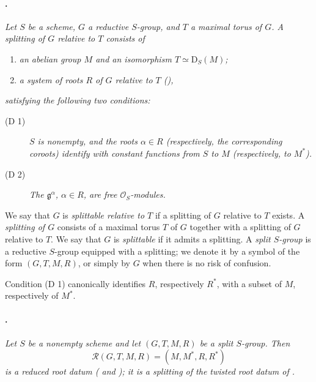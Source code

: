\paragraph{.}
\textit{Let \(S\) be a scheme, \(G\) a reductive \(S\)-group, and
\(T\) a maximal torus of \(G\). A \emph{splitting of \(G\) relative
to \(T\)} consists of}
\begin{enumerate}
\item[\SGAInlineRefTarget{sga3:xxii:def:1.13:item:i}(i)] \textit{an abelian group \(M\) and an isomorphism
  \(T\simeq\mathrm D_S(M)\);}
\item[\SGAInlineRefTarget{sga3:xxii:def:1.13:item:ii}(ii)] \textit{a system of roots \(R\) of \(G\) relative to
  \(T\) \textup{()},}
\end{enumerate}
\textit{satisfying the following two conditions:}
\begin{description}
\item[\textup{(D 1)}]
  \textit{\(S\) is nonempty, and the roots \(\alpha\in R\)
  \textup{(respectively, the corresponding coroots)} identify with
  constant functions from \(S\) to \(M\) \textup{(respectively, to
  \(M^*\))}.}
\item[\textup{(D 2)}]
  \textit{The \(\mathfrak g^\alpha\), \(\alpha\in R\), are free
  \(\mathcal O_S\)-modules.}
\end{description}

We say that \(G\) is \emph{splittable relative to \(T\)} if a
splitting of \(G\) relative to \(T\) exists. A \emph{splitting of
\(G\)} consists of a maximal torus \(T\) of \(G\) together with a
splitting of \(G\) relative to \(T\). We say that \(G\) is
\emph{splittable} if it admits a splitting. A \emph{split
\(S\)-group} is a reductive \(S\)-group equipped with a splitting;
we denote it by a symbol of the form \((G,T,M,R)\), or simply by
\(G\) when there is no risk of confusion.

Condition \textup{(D 1)} canonically identifies \(R\), respectively
\(R^*\), with a subset of \(M\), respectively of \(M^*\).

\paragraph{.}
\textit{Let \(S\) be a nonempty scheme and let \((G,T,M,R)\) be a
split \(S\)-group. Then}
\[
  \mathcal R(G,T,M,R)=(M,M^*,R,R^*)
\]
\textit{is a reduced root datum \textup{( and
)}; it is a splitting of the twisted root datum of .}


